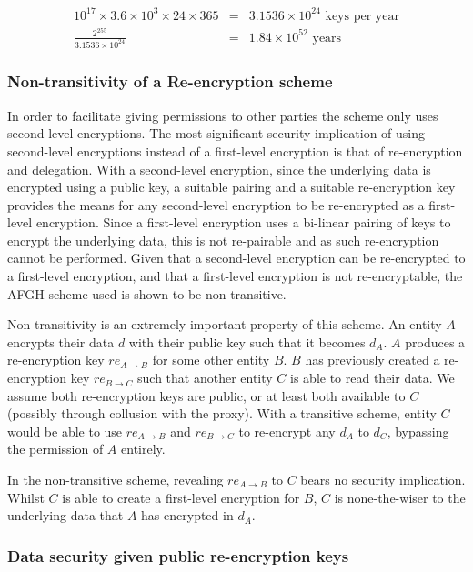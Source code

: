 $$
\begin{aligned}
  10^{17} \times 3.6 \times 10^{3} \times 24 \times 365 &=& 3.1536 \times 10^{24} \text{ keys per year} \\
  \frac{2^{255}}{3.1536 \times 10^{24}} &=& 1.84 \times 10^{52} \text{ years}
\end{aligned}
$$

\subsubsection{Non-transitivity of a Re-encryption scheme}

In order to facilitate giving permissions to other parties the scheme only uses second-level encryptions. The most significant security implication of using second-level encryptions instead of a first-level encryption is that of re-encryption and delegation. With a second-level encryption, since the underlying data is encrypted using a public key, a suitable pairing and a suitable re-encryption key provides the means for any second-level encryption to be re-encrypted as a first-level encryption. Since a first-level encryption uses a bi-linear pairing of keys to encrypt the underlying data, this is not re-pairable and as such re-encryption cannot be performed. Given that a second-level encryption can be re-encrypted to a first-level encryption, and that a first-level encryption is not re-encryptable, the AFGH scheme used is shown to be non-transitive.

Non-transitivity is an extremely important property of this scheme. An entity $A$ encrypts their data $d$ with their public key such that it becomes $d_A$. $A$ produces a re-encryption key $re_{A \rightarrow B}$ for some other entity $B$. $B$ has previously created a re-encryption key $re_{B \rightarrow C}$ such that another entity $C$ is able to read their data. We assume both re-encryption keys are public, or at least both available to $C$ (possibly through collusion with the proxy). With a transitive scheme, entity $C$ would be able to use $re_{A \rightarrow B}$ and $re_{B \rightarrow C}$ to re-encrypt any $d_A$ to $d_C$, bypassing the permission of $A$ entirely.

In the non-transitive scheme, revealing $re_{A \rightarrow B}$ to $C$ bears no security implication. Whilst $C$ is able to create a first-level encryption for $B$, $C$ is none-the-wiser to the underlying data that $A$ has encrypted in $d_A$.

\subsubsection{Data security given public re-encryption keys}



